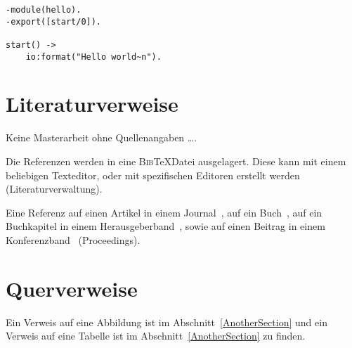 
\lstset{language=erlang, style=customerlang}

\begin{lstlisting}[caption=Das übliche 'Hello World' Spektakel -- diesmal in Erlang.]
-module(hello).
-export([start/0]).

start() ->
	io:format("Hello world~n").
\end{lstlisting}

\section{Literaturverweise}

Keine Masterarbeit ohne Quellenangaben \ldots. 

Die Referenzen werden in eine \textsc{Bib}\TeX Datei ausgelagert. Diese kann mit einem beliebigen Texteditor, oder mit spezifischen Editoren erstellt werden (Literaturverwaltung).

Eine Referenz auf einen Artikel in einem Journal~\cite{Brand:1983vx}, auf ein Buch~\cite{Weske:2012ul}, auf ein Buchkapitel in einem Herausgeberband~\cite{singer2015}, sowie auf einen Beitrag in einem Konferenzband~\cite{Singer:2016hl} (Proceedings).

\section{Querverweise}

Ein Verweis auf eine Abbildung ist im Abschnitt~\ref{AnotherSection} und ein Verweis auf eine Tabelle ist im Abschnitt~\ref{AnotherSection} zu finden.

